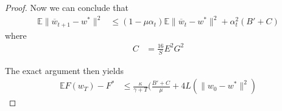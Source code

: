 \begin{proof}
	
	Now we can conclude that 
	\begin{align*}
	\mathbb{E}\|\overline{w}_{t+1}-w^{\ast}\|^{2} & \leq(1-\mu\alpha_{t})\mathbb{E}\|\overline{w}_{t}-w^{\ast}\|^{2}+\alpha_{t}^{2}(B'+C)
	\end{align*}
	where 
	\begin{align*}
	C & =\frac{16}{S}E^{2}G^{2}
	\end{align*}
	
	The exact argument then yields 
	\begin{align*}
	\mathbb{E}F(w_{T})-F^{\ast} & \leq\frac{\kappa}{\gamma+T}(\frac{B'+C}{\mu}+4L(\|w_{0}-w^{\ast}\|^{2})
	\end{align*}
\end{proof}
